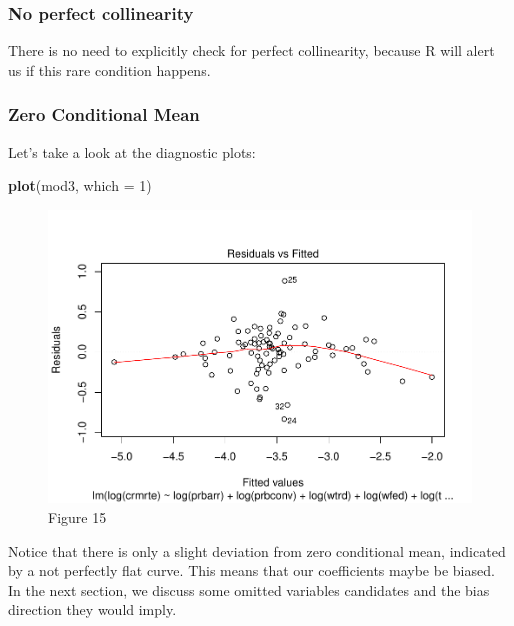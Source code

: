 \documentclass[]{article}
\newenvironment{Shaded}{\begin{snugshade}}{\end{snugshade}}
\newcommand{\DataTypeTok}[1]{\textcolor[rgb]{0.13,0.29,0.53}{#1}}
\newcommand{\DecValTok}[1]{\textcolor[rgb]{0.00,0.00,0.81}{#1}}
\newcommand{\KeywordTok}[1]{\textcolor[rgb]{0.13,0.29,0.53}{\textbf{#1}}}
\newcommand{\NormalTok}[1]{#1}
\begin{document}
\hypertarget{no-perfect-collinearity}{%
\subsubsection{No perfect collinearity}\label{no-perfect-collinearity}}

There is no need to explicitly check for perfect collinearity, because R
will alert us if this rare condition happens.

\hypertarget{zero-conditional-mean}{%
\subsubsection{Zero Conditional Mean}\label{zero-conditional-mean}}

Let's take a look at the diagnostic plots:

\begin{Shaded}
\begin{Highlighting}[]
\KeywordTok{plot}\NormalTok{(mod3, }\DataTypeTok{which =} \DecValTok{1}\NormalTok{)}
\end{Highlighting}
\end{Shaded}

\begin{figure}

{\centering \includegraphics{lab_3_final_files/figure-latex/unnamed-chunk-47-1} 

}

\caption{Figure 15}\label{fig:unnamed-chunk-47}
\end{figure}

Notice that there is only a slight deviation from zero conditional mean,
indicated by a not perfectly flat curve. This means that our
coefficients maybe be biased. In the next section, we discuss some
omitted variables candidates and the bias direction they would imply.
\end{document}
